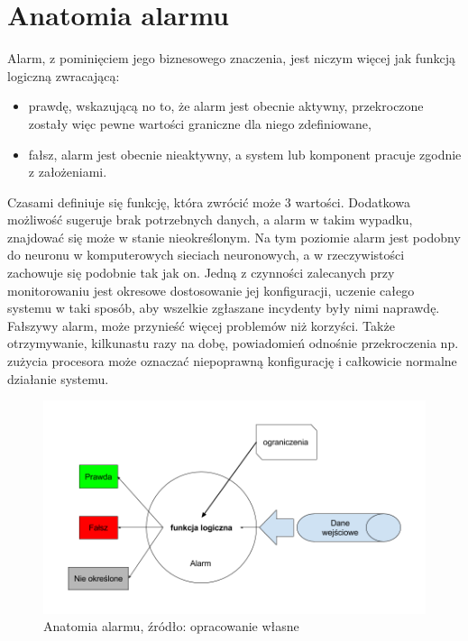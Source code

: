 \section{Anatomia alarmu}
\label{chapter:monitoring:anatomy_of_alarm}

    Alarm, z pominięciem jego biznesowego znaczenia, jest niczym więcej jak funkcją logiczną zwracającą:
    \begin{itemize}
        \item prawdę, wskazującą no to, że alarm jest obecnie aktywny, przekroczone zostały więc
        pewne wartości graniczne dla niego zdefiniowane,
        \item fałsz, alarm jest obecnie nieaktywny, a system lub komponent pracuje zgodnie z założeniami.
    \end{itemize}
    Czasami definiuje się funkcję, która zwrócić może 3 wartości. Dodatkowa możliwość sugeruje brak 
    potrzebnych danych, a alarm w takim wypadku, znajdować się może w stanie nieokreślonym. Na tym poziomie alarm
    jest podobny do neuronu w komputerowych sieciach neuronowych, a w rzeczywistości zachowuje się podobnie tak jak on.
    Jedną z czynności zalecanych przy monitorowaniu jest okresowe dostosowanie jej konfiguracji, uczenie całego
    systemu w taki sposób, aby wszelkie zgłaszane incydenty były nimi naprawdę. Fałszywy alarm, może
    przynieść więcej problemów niż korzyści. Także otrzymywanie, kilkunastu razy na dobę, powiadomień odnośnie przekroczenia 
    np. zużycia procesora może oznaczać niepoprawną konfigurację i całkowicie normalne działanie systemu.
    
    \begin{figure}[H]
        \centering
        \includegraphics[width=1.0\textwidth]{images/alarm_anatomy}
        \caption[Anatomia alarmu]{Anatomia alarmu, źródło: {opracowanie własne}}
        \label{chapter:monitoring:anatomy_of_alarm:picture}
    \end{figure}
   
